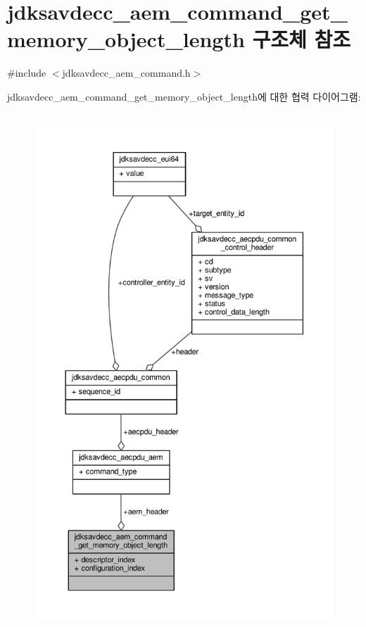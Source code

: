\hypertarget{structjdksavdecc__aem__command__get__memory__object__length}{}\section{jdksavdecc\+\_\+aem\+\_\+command\+\_\+get\+\_\+memory\+\_\+object\+\_\+length 구조체 참조}
\label{structjdksavdecc__aem__command__get__memory__object__length}


{\ttfamily \#include $<$jdksavdecc\+\_\+aem\+\_\+command.\+h$>$}



jdksavdecc\+\_\+aem\+\_\+command\+\_\+get\+\_\+memory\+\_\+object\+\_\+length에 대한 협력 다이어그램\+:
\nopagebreak
\begin{figure}[H]
\begin{center}
\leavevmode
\includegraphics[height=550pt]{structjdksavdecc__aem__command__get__memory__object__length__coll__graph}
\end{center}
\end{figure}
